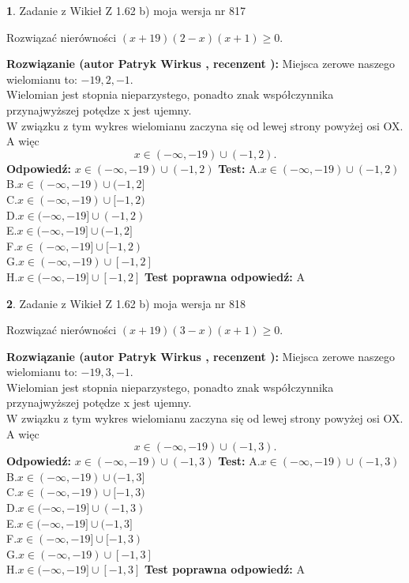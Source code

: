 \documentclass[12pt, a4paper]{article}
\theoremstyle{definition} %
\newtheorem{zad}{}
\newcommand{\zadStart}[1]{\begin{zad}#1\newline}
\newcommand{\zadStop}{\end{zad}}
\newcommand{\rozwStart}[2]{\noindent \textbf{Rozwiązanie (autor #1 , recenzent #2): }\newline}
\newcommand{\rozwStop}{\newline}
\newcommand{\odpStart}{\noindent \textbf{Odpowiedź:}\newline}
\newcommand{\odpStop}{\newline}
\newcommand{\testStart}{\noindent \textbf{Test:}\newline}
\newcommand{\testStop}{\newline}
\newcommand{\kluczStart}{\noindent \textbf{Test poprawna odpowiedź:}\newline}
\newcommand{\kluczStop}{\newline}
\begin{document}
\zadStart{Zadanie z Wikieł Z 1.62 b) moja wersja nr 817}

Rozwiązać nierówności $(x+19)(2-x)(x+1)\ge0$.
\zadStop
\rozwStart{Patryk Wirkus}{}
Miejsca zerowe naszego wielomianu to: $-19, 2, -1$.\\
Wielomian jest stopnia nieparzystego, ponadto znak współczynnika przy\linebreak najwyższej potędze x jest ujemny.\\ W związku z tym wykres wielomianu zaczyna się od lewej strony powyżej osi OX. A więc $$x \in (-\infty,-19) \cup (-1,2).$$
\rozwStop
\odpStart
$x \in (-\infty,-19) \cup (-1,2)$
\odpStop
\testStart
A.$x \in (-\infty,-19) \cup (-1,2)$\\
B.$x \in (-\infty,-19) \cup (-1,2]$\\
C.$x \in (-\infty,-19) \cup [-1,2)$\\
D.$x \in (-\infty,-19] \cup (-1,2)$\\
E.$x \in (-\infty,-19] \cup (-1,2]$\\
F.$x \in (-\infty,-19] \cup [-1,2)$\\
G.$x \in (-\infty,-19) \cup [-1,2]$\\
H.$x \in (-\infty,-19] \cup [-1,2]$
\testStop
\kluczStart
A
\kluczStop



\zadStart{Zadanie z Wikieł Z 1.62 b) moja wersja nr 818}

Rozwiązać nierówności $(x+19)(3-x)(x+1)\ge0$.
\zadStop
\rozwStart{Patryk Wirkus}{}
Miejsca zerowe naszego wielomianu to: $-19, 3, -1$.\\
Wielomian jest stopnia nieparzystego, ponadto znak współczynnika przy\linebreak najwyższej potędze x jest ujemny.\\ W związku z tym wykres wielomianu zaczyna się od lewej strony powyżej osi OX. A więc $$x \in (-\infty,-19) \cup (-1,3).$$
\rozwStop
\odpStart
$x \in (-\infty,-19) \cup (-1,3)$
\odpStop
\testStart
A.$x \in (-\infty,-19) \cup (-1,3)$\\
B.$x \in (-\infty,-19) \cup (-1,3]$\\
C.$x \in (-\infty,-19) \cup [-1,3)$\\
D.$x \in (-\infty,-19] \cup (-1,3)$\\
E.$x \in (-\infty,-19] \cup (-1,3]$\\
F.$x \in (-\infty,-19] \cup [-1,3)$\\
G.$x \in (-\infty,-19) \cup [-1,3]$\\
H.$x \in (-\infty,-19] \cup [-1,3]$
\testStop
\kluczStart
A
\kluczStop
\end{document}
